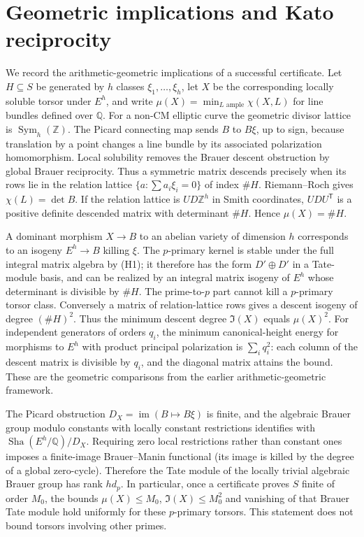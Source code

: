 \documentclass[11pt,a4paper]{article}
\theoremstyle{definition}\newtheorem{definition}[theorem]{Definition}
\theoremstyle{remark}\newtheorem{remark}[theorem]{Remark}
\newcommand{\Sha}{\operatorname{\mathrm{Sha}}}\newcommand{\ZZ}{\mathbb Z}\newcommand{\QQ}{\mathbb Q}\newcommand{\FF}{\mathbb F}\newcommand{\Gal}{\operatorname{Gal}}\newcommand{\Hom}{\operatorname{Hom}}\newcommand{\End}{\operatorname{End}}\newcommand{\Cl}{\operatorname{Cl}}\newcommand{\Sel}{\operatorname{Sel}}\newcommand{\rk}{\operatorname{rank}}\newcommand{\corank}{\operatorname{corank}}\newcommand{\ord}{\operatorname{ord}}\newcommand{\im}{\operatorname{im}}\newcommand{\length}{\operatorname{length}}\newcommand{\GL}{\operatorname{GL}}\newcommand{\NS}{\operatorname{NS}}\newcommand{\Br}{\operatorname{Br}}\newcommand{\Pic}{\operatorname{Pic}}\newcommand{\Sym}{\operatorname{Sym}}\newcommand{\R}{\mathcal R}\newcommand{\A}{\mathcal A}\newcommand{\D}{\mathcal D}\newcommand{\W}{\mathscr W}\newcommand{\Y}{\mathscr Y}\newcommand{\I}{\mathfrak I}
\numberwithin{equation}{section}
\begin{document}
\section{Geometric implications and Kato reciprocity}
We record the arithmetic-geometric implications of a successful certificate. Let $H\subseteq S$ be generated by $h$ classes $\xi_1,\ldots,\xi_h$, let $X$ be the corresponding locally soluble torsor under $E^h$, and write $\mu(X)=\min_{L\text{ ample}}\chi(X,L)$ for line bundles defined over $\QQ$. For a non-CM elliptic curve the geometric divisor lattice is $\Sym_h(\ZZ)$. The Picard connecting map sends $B$ to $B\xi$, up to sign, because translation by a point changes a line bundle by its associated polarization homomorphism. Local solubility removes the Brauer descent obstruction by global Brauer reciprocity. Thus a symmetric matrix descends precisely when its rows lie in the relation lattice $\{a:\sum a_i\xi_i=0\}$ of index $\#H$. Riemann--Roch gives $\chi(L)=\det B$. If the relation lattice is $UD\ZZ^h$ in Smith coordinates, $UDU^{\mathsf T}$ is a positive definite descended matrix with determinant $\#H$. Hence $\mu(X)=\#H$.

A dominant morphism $X\to B$ to an abelian variety of dimension $h$ corresponds to an isogeny $E^h\to B$ killing $\xi$. The $p$-primary kernel is stable under the full integral matrix algebra by (H1); it therefore has the form $D'\oplus D'$ in a Tate-module basis, and can be realized by an integral matrix isogeny of $E^h$ whose determinant is divisible by $\#H$. The prime-to-$p$ part cannot kill a $p$-primary torsor class. Conversely a matrix of relation-lattice rows gives a descent isogeny of degree $(\#H)^2$. Thus the minimum descent degree $\I(X)$ equals $\mu(X)^2$. For independent generators of orders $q_i$, the minimum canonical-height energy for morphisms to $E^h$ with product principal polarization is $\sum_i q_i^2$: each column of the descent matrix is divisible by $q_i$, and the diagonal matrix attains the bound. These are the geometric comparisons from the earlier arithmetic-geometric framework.

The Picard obstruction $D_X=\im(B\mapsto B\xi)$ is finite, and the algebraic Brauer group modulo constants with locally constant restrictions identifies with $\Sha(E^h/\QQ)/D_X$. Requiring zero local restrictions rather than constant ones imposes a finite-image Brauer--Manin functional (its image is killed by the degree of a global zero-cycle). Therefore the Tate module of the locally trivial algebraic Brauer group has rank $hd_p$. In particular, once a certificate proves $S$ finite of order $M_0$, the bounds $\mu(X)\le M_0$, $\I(X)\le M_0^2$ and vanishing of that Brauer Tate module hold uniformly for these $p$-primary torsors. This statement does not bound torsors involving other primes.
\end{document}
